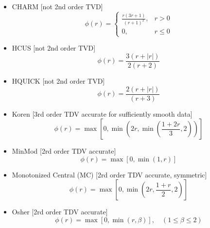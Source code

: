 	\begin{itemize}
	
		\item CHARM [not 2nd order TVD] \cite{Zhou95}
			\begin{equation}
				\phi\left(r\right)=
				\begin{cases}
					\frac{r\left(3r+1\right)}{\left(r+1\right)^2},    &r>0\\
					0,  &r\leq0
				\end{cases}
			\end{equation}
			
		\item HCUS [not 2nd order TVD] \cite{Waterson95}
			\begin{equation}
				\phi\left(r\right)=\frac{3\left(r+\left|r\right|\right)}{2\left(r+2\right)}
			\end{equation}
			
		\item HQUICK [not 2nd order TVD] \cite{Waterson95}
			\begin{equation}
				\phi\left(r\right)=\frac{2\left(r+\left|r\right|\right)}{\left(r+3\right)}
			\end{equation}
			
		\item Koren [3rd order TDV accurate for sufficiently smooth data] \cite{Koren93}
			\begin{equation}
				\phi\left(r\right)=\max\left[0,\min\left(2r,\min\left(\frac{1+2r}{3},2\right)\right)\right]
			\end{equation}
			
		\item MinMod [2rd order TDV accurate] \cite{Roe86}
			\begin{equation}
				\phi\left(r\right)=\max\left[0,\min\left(1,r\right)\right]
			\end{equation}
			
		\item Monotonized Central (MC) [2rd order TDV accurate, symmetric] \cite{VanLeer77}
			\begin{equation}
				\phi\left(r\right)=\max\left[0,\min\left(2r, \frac{1+r}{2},2\right)\right]
			\end{equation}
			
		\item Osher [2rd order TDV accurate] \cite{Osher83}
			\begin{equation}
				\phi\left(r\right)=\max\left[0,\min\left(r,\beta\right)\right], \quad\left(1\leq\beta\leq2\right)
			\end{equation}
			

\end{itemize}
